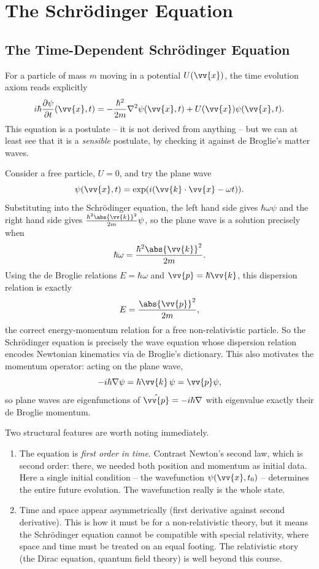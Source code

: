 \section{The Schr\"odinger Equation}

\subsection{The Time-Dependent Schr\"odinger Equation}

For a particle of mass $m$ moving in a potential $U(\vv{x})$, the time evolution axiom reads explicitly
$$
i \hbar \frac{\partial \psi}{\partial t}(\vv{x}, t) = -\frac{\hbar^2}{2m} \nabla^2 \psi(\vv{x}, t) + U(\vv{x}) \psi(\vv{x}, t).
$$
This equation is a postulate -- it is not derived from anything -- but we can at least see that it is a \emph{sensible} postulate, by checking it against de Broglie's matter waves.

Consider a free particle, $U = 0$, and try the plane wave
$$
\psi(\vv{x}, t) = \exp(i(\vv{k} \cdot \vv{x} - \omega t)).
$$
Substituting into the Schr\"odinger equation, the left hand side gives $\hbar \omega \psi$ and the right hand side gives $\frac{\hbar^2 \abs{\vv{k}}^2}{2m} \psi$, so the plane wave is a solution precisely when
$$
\hbar \omega = \frac{\hbar^2 \abs{\vv{k}}^2}{2m}.
$$
Using the de Broglie relations $E = \hbar \omega$ and $\vv{p} = \hbar \vv{k}$, this dispersion relation is exactly
$$
E = \frac{\abs{\vv{p}}^2}{2m},
$$
the correct energy-momentum relation for a free non-relativistic particle. So the Schr\"odinger equation is precisely the wave equation whose dispersion relation encodes Newtonian kinematics via de Broglie's dictionary. This also motivates the momentum operator: acting on the plane wave,
$$
-i\hbar \nabla \psi = \hbar \vv{k} \, \psi = \vv{p} \psi,
$$
so plane waves are eigenfunctions of $\hat{\vv{p}} = -i\hbar\nabla$ with eigenvalue exactly their de Broglie momentum.

\begin{remark}
    Two structural features are worth noting immediately.
    \begin{enumerate}[label=(\roman*)]
        \item The equation is \emph{first order in time}. Contrast Newton's second law, which is second order: there, we needed both position and momentum as initial data. Here a single initial condition -- the wavefunction $\psi(\vv{x}, t_0)$ -- determines the entire future evolution. The wavefunction really is the whole state.
        \item Time and space appear asymmetrically (first derivative against second derivative). This is how it must be for a non-relativistic theory, but it means the Schr\"odinger equation cannot be compatible with special relativity, where space and time must be treated on an equal footing. The relativistic story (the Dirac equation, quantum field theory) is well beyond this course.
    \end{enumerate}
\end{remark}

